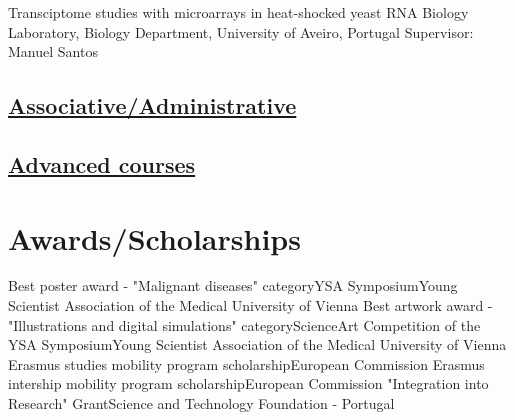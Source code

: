 \documentclass[11pt,a4paper,roman]{moderncv} %
\begin{document}
            {Transciptome studies with microarrays in heat-shocked yeast}
            {RNA Biology Laboratory, Biology Department, University of Aveiro, Portugal}{}
            {}
            {Supervisor: Manuel Santos}

    \subsection{\underline{Associative/Administrative}}


    \subsection{\underline{Advanced courses}}


\section{Awards/Scholarships}

        {Best poster award - "Malignant diseases" category}{YSA Symposium}{}{}{Young Scientist Association of the Medical University of Vienna}
        {Best artwork award - "Illustrations and digital simulations" category}{ScienceArt Competition of the YSA Symposium}{}{}{Young Scientist Association of the Medical University of Vienna}
        {Erasmus studies mobility program scholarship}{}{}{}{European Commission}
        {Erasmus intership mobility program scholarship}{}{}{}{European Commission}
        {"Integration into Research" Grant}{}{}{}{Science and Technology Foundation - Portugal}
\end{document}
